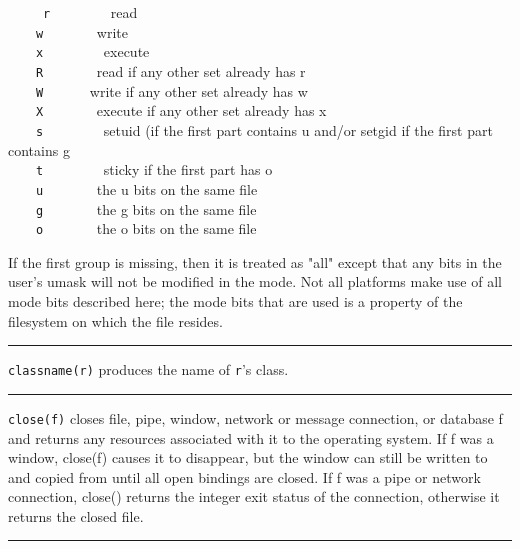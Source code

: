 \ \ \ \ \ \texttt{r} \ \ \ \ \ \ \ \ read\\
 \ \ \ \ \texttt{w} \ \ \ \ \ \ \ write\\
 \ \ \ \ \texttt{x} \ \ \ \ \ \ \ \ execute\\
 \ \ \ \ \texttt{R} \ \ \ \ \ \ \ read if any other set already has
r\\
 \ \ \ \ \texttt{W} \ \ \ \ \ \ write if any other set already has
w\\
 \ \ \ \ \texttt{X} \ \ \ \ \ \ \ execute if any other set already has
x\\
 \ \ \ \ \texttt{s} \ \ \ \ \ \ \ \ setuid (if the first part contains u
and/or setgid if the first part contains g\\
 \ \ \ \ \texttt{t} \ \ \ \ \ \ \ \ sticky if the first part has
o\\
 \ \ \ \ \texttt{u} \ \ \ \ \ \ \ the u bits on the same file\\
 \ \ \ \ \texttt{g} \ \ \ \ \ \ \ the g bits on the same file\\
 \ \ \ \ \texttt{o} \ \ \ \ \ \ \ the o bits on the same file

If the first group is missing, then it is treated as
"all" except that any bits in the
user's umask will not be modified in the mode. Not all
platforms make use of all mode bits described here; the mode bits that
are used is a property of the filesystem on which the file resides.

\bigskip\hrule\vspace{0.1cm}

\noindent
\texttt{classname(r)} produces the name of \texttt{r}'s
class.

\bigskip\hrule\vspace{0.1cm}

\noindent
{}\texttt{close(f)} closes file, pipe,
window, network or message connection, or database f
and returns any resources associated with it to the operating system.
If f was a window, close(f) causes it to disappear, but the window can
still be written to and copied from until all open bindings are closed.
If f was a pipe or network connection, close() returns the integer exit
status of the connection, otherwise it returns the closed file.

\bigskip\hrule\vspace{0.1cm}

